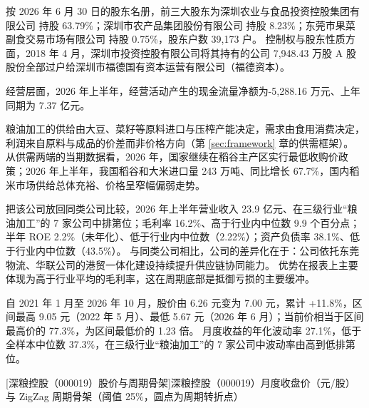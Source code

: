  按 2026 年 6 月 30 日的股东名册，前三大股东为深圳农业与食品投资控股集团有限公司 持股 63.79\%；深圳市农产品集团股份有限公司 持股 8.23\%；东莞市果菜副食交易市场有限公司 持股 0.75\%，股东户数 39,173 户。 控制权与股东性质方面，2018 年 4 月，深圳市投资控股有限公司将其持有的公司 7,948.43 万股 A 股股份全部过户给深圳市福德国有资本运营有限公司（福德资本）。

 经营层面，2026 年上半年，经营活动产生的现金流量净额为-5,288.16 万元、上年同期为 7.37 亿元。

 粮油加工的供给由大豆、菜籽等原料进口与压榨产能决定，需求由食用消费决定，利润来自原料与成品的价差而非价格方向（第 \ref{sec:framework} 章的供需框架）。 从供需两端的当期数据看，2026 年，国家继续在稻谷主产区实行最低收购价政策；2026 年上半年，我国稻谷和大米进口量 243 万吨、同比增长 67.7\%，国内稻米市场供给总体充裕、价格呈窄幅偏弱走势。

 把该公司放回同类公司比较，2026 年上半年营业收入 23.9 亿元、在三级行业“粮油加工”的 7 家公司中排第位；毛利率 16.2\%、高于行业内中位数 9.9 个百分点；半年 ROE 2.2\%（未年化）、低于行业内中位数（2.22\%）；资产负债率 38.1\%、低于行业内中位数（43.5\%）。 与同类公司相比，公司的差异化在于：公司依托东莞物流、华联公司的港贸一体化建设持续提升供应链协同能力。 优势在报表上主要体现为高于行业平均的毛利率，这在周期底部是抵御亏损的主要缓冲。

 自 2021 年 1 月至 2026 年 10 月，股价由 6.26 元变为 7.00 元，累计 +11.8\%，区间最高 9.05 元（2022 年 5 月）、最低 5.67 元（2026 年 6 月）；当前价相当于区间最高价的 77.3\%，为区间最低价的 1.23 倍。 月度收益的年化波动率 27.1\%，低于全样本中位数 37.3\%，在三级行业“粮油加工”的 7 家公司中波动率由高到低排第位。

\begin{center}
\begin{minipage}{\textwidth}\centering
{}

[深粮控股（000019）股价与周期骨架]{深粮控股（000019）月度收盘价（元/股）与 ZigZag 周期骨架（阈值 25\%，圆点为周期转折点）}
\end{minipage}
\end{center}

